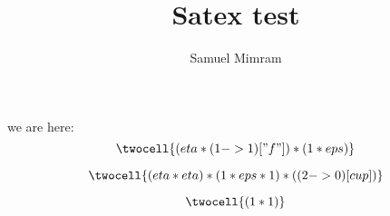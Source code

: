 \documentclass[a4paper]{article}
\title{Satex test}
\author{Samuel Mimram}
\begin{document}
\maketitle

we are here:
\[
  \twocell{(eta * (1->1)["f"]) * (1 * eps)}
\]

\[
  \twocell{(eta * eta) * (1 * eps * 1) * ((2->0)[cup])}
\]

\[
  \twocell{(1 * 1)}
\]





\end{document}
